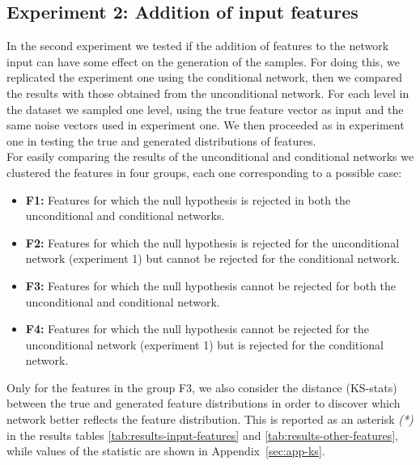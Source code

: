 \subsection{Experiment 2: Addition of input features}
\label{sec:experiment-2}
In the second experiment we tested if the addition of features to the network input can have some effect on the generation of the samples. For doing this, we replicated the experiment one using the conditional network, then we compared the results with those obtained from the unconditional network. For each level in the dataset we sampled one level, using the true feature vector as input and
the same noise vectors used in experiment one. We then proceeded as in experiment one in testing the true and generated distributions of features. \\
For easily comparing the results of the unconditional and conditional networks we clustered the features in four groups, each one corresponding to a possible case: \\
\begin{itemize}
	\item \textbf{F1:} Features for which the null hypothesis is rejected in both the unconditional and conditional networks. 
	\item \textbf{F2:} Features for which the null hypothesis is rejected for the unconditional network (experiment 1) but cannot be rejected for the conditional network. 
	\item \textbf{F3:} Features for which the null hypothesis cannot be rejected for both the unconditional  and conditional network.
	\item \textbf{F4:} Features for which the null hypothesis cannot be rejected for the unconditional network (experiment 1) but is rejected for the conditional network.
\end{itemize}

Only for the features in the group F3, we also consider the distance (KS-stats) between the true and generated feature distributions in order to discover which network better reflects the feature distribution. This is reported as an asterisk \textit{(*)} in the results tables \ref{tab:results-input-features} and \ref{tab:results-other-features}, while values of the statistic are shown in Appendix~\ref{sec:app-ks}.

